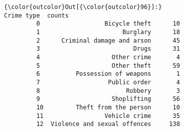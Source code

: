 \documentclass[11pt]{article}
\begin{document}
\begin{Verbatim}[commandchars=\\\{\}]
{\color{outcolor}Out[{\color{outcolor}96}]:}                       Crime type  counts
         0                  Bicycle theft      10
         1                       Burglary      18
         2      Criminal damage and arson      45
         3                          Drugs      31
         4                    Other crime       4
         5                    Other theft      59
         6          Possession of weapons       1
         7                   Public order       4
         8                        Robbery       3
         9                    Shoplifting      56
         10         Theft from the person      10
         11                 Vehicle crime      35
         12  Violence and sexual offences     138
\end{Verbatim}
            
\end{document}
